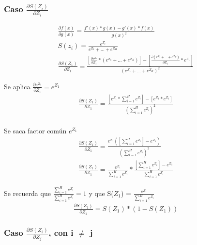 \subsubsection{Caso $\frac{\partial S(Z_i)}{\partial Z_i}$}

\begin{gather}
	\frac{\partial f(x)}{\partial g(x)} = \frac{f'(x)*g(x) - g'(x)*f(x)}{g(x)^2} \\
	S(z_i) = \frac{e^{Z_i}}{e^{Z_1} + ... + e^{Z_H}} \\
	\frac{\partial S(Z_1)}{\partial Z_1} = \frac{[\frac{\partial e^{Z_1}}{\partial Z_1} * (e^{Z_1} + ... + e^{Z_H}) ] - [\frac{\partial (e^{Z_1} + ... + e^{Z_H})}{\partial Z_1} * e^{Z_1} ] }{(e^{Z_1} + ... + e^{Z_H})^2} 
\end{gather}

Se aplica $\frac{\partial e^{Z_1}}{\partial Z_1} = e^{Z_1}$ \\
\begin{gather}
	\frac{\partial S(Z_1)}{\partial Z_1} = \frac{[e^{Z_1} * \sum_{i=1}^{H}  e^{Z_i}] - [e^{Z_1} * e^{Z_1}]   }{ (\sum_{i=1}^{H}  e^{Z_i})^2} \\
\end{gather}

Se saca factor común $e^{Z_1}$ \\
\begin{gather}
	\frac{\partial S(Z_1)}{\partial Z_1} = \frac{e^{Z_1} ([\sum_{i=1}^{H}  e^{Z_i}] - e^{Z_1})  }{(\sum_{i=1}^{H}  e^{Z_i})^2} \\
	\frac{\partial S(Z_1)}{\partial Z_1} = \frac{e^{Z_1}}{\sum_{i=1}^{H}  e^{Z_i}} * \frac{[\sum_{i=1}^{H}  e^{Z_i}] - e^{Z_1}}{\sum_{i=1}^{H}  e^{Z_i}}
\end{gather}

Se recuerda que $\frac{\sum_{i=1}^{H}  e^{Z_i}}{\sum_{i=1}^{H}  e^{Z_i}} = 1$ y que S($Z_1$) = $ \frac{e^{Z_1}}{\sum_{i=1}^{H}  e^{Z_i}}$ \\
\begin{gather}
	\frac{\partial S(Z_1)}{\partial Z_1} = S(Z_1) * (1- S(Z_1))
	\label{grad_Oi_Zk_drch}
\end{gather}

\subsubsection{Caso $\frac{\partial S(Z_i)}{\partial Z_j}$, con i $\neq$ j}

